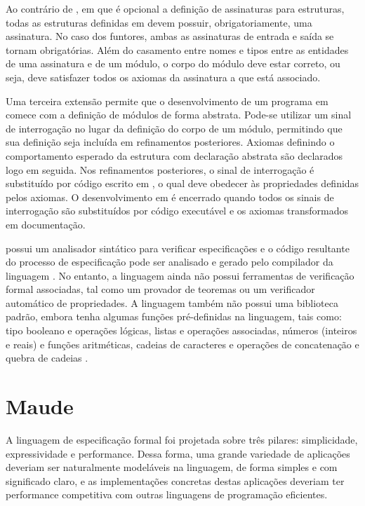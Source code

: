 Ao contrário de \SML, em que é opcional a definição de assinaturas para estruturas, todas as estruturas definidas em \EML devem possuir, obrigatoriamente, uma assinatura.
No caso dos funtores, ambas as assinaturas de entrada e saída se tornam obrigatórias.
Além do casamento entre nomes e tipos entre as entidades de uma assinatura e de um módulo, o corpo do módulo deve estar correto, ou seja, deve satisfazer todos os axiomas da assinatura a que está associado.

Uma terceira extensão permite que o desenvolvimento de um programa em \EML comece com a definição de módulos de forma abstrata.
Pode-se utilizar um sinal de interrogação no lugar da definição do corpo de um módulo, permitindo que sua definição seja incluída em refinamentos posteriores.
Axiomas definindo o comportamento esperado da estrutura com declaração abstrata são declarados logo em seguida.
Nos refinamentos posteriores, o sinal de interrogação é substituído por código escrito em \SML, o qual deve obedecer às propriedades definidas pelos axiomas.
O desenvolvimento em \EML é encerrado quando todos os sinais de interrogação são substituídos por código \SML executável e os axiomas transformados em documentação.

\EML possui um analisador sintático para verificar especificações e o código \SML resultante do processo de especificação pode ser analisado e gerado pelo compilador da linguagem \SML.
No entanto, a linguagem ainda não possui ferramentas de verificação formal associadas, tal como um provador de teoremas ou um verificador automático de propriedades.
A linguagem também não possui uma biblioteca padrão, embora tenha algumas funções pré-definidas na linguagem, tais como: tipo booleano e operações lógicas, listas e operações associadas, números (inteiros e reais) e funções aritméticas, cadeias de caracteres e operações de concatenação e quebra de cadeias \cite{MLDef}.

\section{Maude}\label{chap:revisaobib:maude}

A linguagem de especificação formal \Maude \cite{MaudeBook} foi projetada sobre três pilares: simplicidade, expressividade e performance.
Dessa forma, uma grande variedade de aplicações deveriam ser naturalmente modeláveis na linguagem, de forma simples e com significado claro, e as implementações concretas destas aplicações deveriam ter performance competitiva com outras linguagens de programação eficientes.

